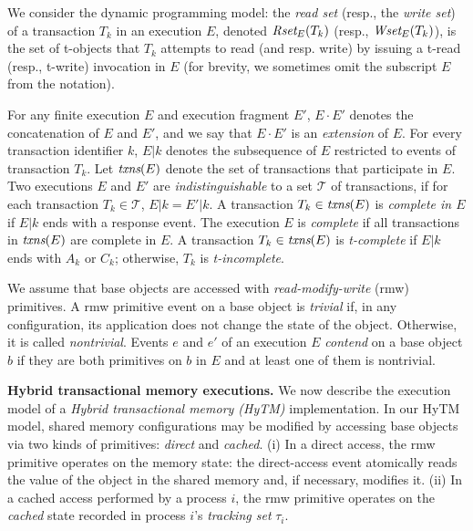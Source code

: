 We consider the dynamic programming model: the \emph{read set} (resp., the \emph{write set}) of a transaction $T_k$ in an execution $E$,
denoted $\textit{Rset}_E(T_k)$ (resp., $\textit{Wset}_E(T_k)$), is the set of t-objects that $T_k$ attempts to read (and resp. write) 
by issuing a t-read (resp., t-write) invocation in $E$ (for brevity, we sometimes 
omit the subscript $E$ from the notation).

For any finite execution $E$ and execution fragment $E'$, $E\cdot E'$ denotes the concatenation of $E$ and $E'$,
and we say that $E\cdot E'$ is an \emph{extension}
of $E$.
For every transaction identifier $k$,
$E|k$ denotes the subsequence of $E$ restricted to events of
transaction $T_k$.
Let $\textit{txns}(E)$ denote the set of transactions that participate in $E$.
Two executions $E$ and $E'$
are \emph{indistinguishable} to a set $\mathcal{T}$ of transactions, if
for each transaction $T_k \in \mathcal{T}$, $E|k=E'|k$.
A transaction $T_k\in \textit{txns}(E)$ is \emph{complete in $E$} if
$E|k$ ends with a response event.
The execution $E$ is \emph{complete} if all transactions in $\textit{txns}(E)$
are complete in $E$.
A transaction $T_k\in \textit{txns}(E)$ is \emph{t-complete} if $E|k$
ends with $A_k$ or $C_k$; otherwise, $T_k$ is \emph{t-incomplete}.

We assume that base objects are accessed with \emph{read-modify-write} (rmw) primitives. 
A rmw primitive event on a base object is \emph{trivial} if, in any configuration, its application
does not change the state of the object. 
Otherwise, it is called \emph{nontrivial}.
Events $e$ and $e'$ of an execution $E$  \emph{contend} on a base
object $b$ if they are both primitives on $b$ in $E$ and at least 
one of them is nontrivial.

\vspace{1mm}\noindent\textbf{Hybrid transactional memory executions.}
We now describe the execution model of a \emph{Hybrid transactional memory (HyTM)} implementation.
In our HyTM model, shared memory configurations may be modified by accessing base objects via two kinds of
primitives: \emph{direct} and \emph{cached}.
(i) In a direct access, the rmw primitive operates on the memory state:
the direct-access event atomically reads the value of the object in
the shared memory and, if necessary, modifies it.
(ii) In a cached access performed by a process $i$, the rmw primitive operates on the \emph{cached}
state recorded in process $i$'s \emph{tracking set} $\tau_i$. 

